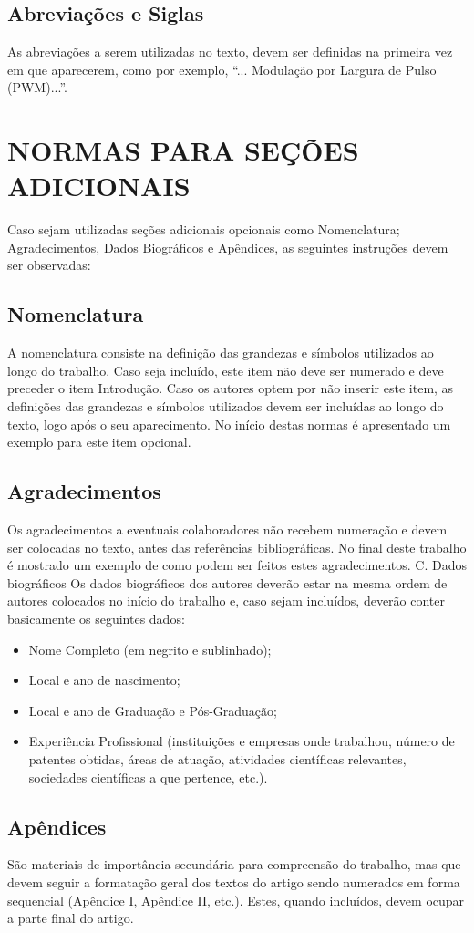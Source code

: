 \documentclass{ceel}
\begin{document}
\begin{multicols}{2}
\subsection{ Abreviações e Siglas}
As abreviações a serem utilizadas no texto, devem ser definidas na primeira vez em que aparecerem, como por exemplo, “... Modulação por Largura de Pulso (PWM)...”.
\section{NORMAS PARA SEÇÕES ADICIONAIS}

Caso sejam utilizadas seções adicionais opcionais como Nomenclatura; Agradecimentos, Dados Biográficos e Apêndices, as seguintes instruções devem ser observadas:
\subsection{Nomenclatura} 
A nomenclatura consiste na definição das grandezas e símbolos utilizados ao longo do trabalho. Caso seja incluído, este item não deve ser numerado e deve preceder o item Introdução. Caso os autores optem por não inserir este item, as definições das grandezas e símbolos utilizados devem ser incluídas ao longo do texto, logo após o seu aparecimento. No início destas normas é apresentado um exemplo para este item opcional.
\subsection{Agradecimentos}
Os agradecimentos a eventuais colaboradores não recebem numeração e devem ser colocadas no texto, antes das referências bibliográficas. No final deste trabalho é mostrado um exemplo de como podem ser feitos estes agradecimentos.
C. Dados biográficos
Os dados biográficos dos autores deverão estar na mesma ordem de autores colocados no início do trabalho e, caso sejam incluídos, deverão conter basicamente os seguintes dados:
\begin{itemize}
\item Nome Completo (em negrito e sublinhado);
\item	Local e ano de nascimento;
\item	Local e ano de Graduação e Pós-Graduação;
\item	Experiência Profissional (instituições e empresas onde trabalhou, número de patentes obtidas, áreas de atuação, atividades científicas relevantes, sociedades científicas a que pertence, etc.).
\end{itemize}
\subsection{Apêndices}
São materiais de importância secundária para compreensão do trabalho, mas que devem seguir a formatação geral dos textos do artigo sendo numerados em forma sequencial (Apêndice I, Apêndice II, etc.). Estes, quando incluídos, devem ocupar a parte final do artigo.\\


\end{multicols}
\end{document}
